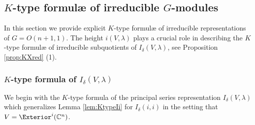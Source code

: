 \subsection{$K$-type formul{\ae} of irreducible $G$-modules
\label{subsec:Ktypes}}

In this section we provide explicit $K$-type formul{\ae}
 of irreducible representations of $G=O(n+1,1)$.  
The height $i(V,\lambda)$ plays a crucial role
 in describing the $K$-type formul{\ae}
 of irreducible subquotients
 of $I_{\delta}(V, \lambda)$, 
 see Proposition \ref{prop:KXred} (1).  

\subsubsection{$K$-type formula of $I_{\delta}(V, \lambda)$}
We begin with the $K$-type formula
 of the principal series representation
 $I_{\delta}(V, \lambda)$
 which generalizes Lemma \ref{lem:KtypeIi}
 for $I_{\delta}(i,i)$ 
 in the setting that $V=\Exterior^i({\mathbb{C}}^n)$.  

